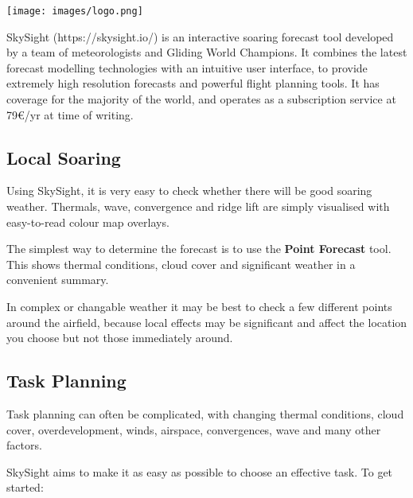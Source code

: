 \documentclass[9pt,a4paper,twocolumn]{article}
\begin{document}
\texttt{[image: images/logo.png]}

SkySight (https://skysight.io/) is an interactive soaring forecast tool developed by a team of meteorologists and Gliding World Champions. It combines the latest forecast modelling technologies with an intuitive user interface, to provide extremely high resolution forecasts and powerful flight planning tools. It has coverage for the majority of the world, and operates as a subscription service at 79\euro /yr at time of writing.
\subsection*{Local Soaring}
Using SkySight, it is very easy to check whether there will be good soaring weather. Thermals, wave, convergence and ridge lift are simply visualised with easy-to-read colour map overlays.

The simplest way to determine the forecast is to use the \textbf{Point Forecast} tool. This shows thermal conditions, cloud cover and significant weather in a convenient summary.

In complex or changable weather it may be best to check a few different points around the airfield, because local effects may be significant and affect the location you choose but not those immediately around.

\subsection*{Task Planning}
Task planning can often be complicated, with changing thermal conditions, cloud cover, overdevelopment, winds, airspace, convergences, wave and many other factors.

SkySight aims to make it as easy as possible to choose an effective task. To get started:
\end{document}
